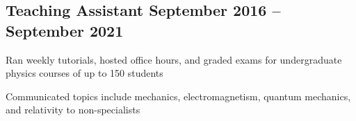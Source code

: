 \documentclass[letter,10pt]{article}
\begin{document}
\subsection{{Teaching Assistant  \hfill September 2016 – September 2021}}
\begin{zitemize}
\item Ran weekly tutorials, hosted office hours, and graded exams for undergraduate physics courses of up to 150 students
\item Communicated topics include mechanics, electromagnetism, quantum mechanics, and relativity to non-specialists
\end{zitemize}
\end{document}
